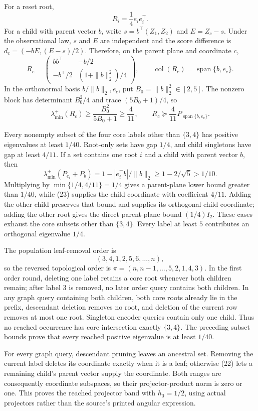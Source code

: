 For a reset root,
\[
 R_i=\frac14e_ie_i^{\top}.
 \tag{21}
\]
For a child with parent vector \(b\), write \(s=b^{\top}(Z_1,Z_2)\) and \(E=Z_c-s\).  Under the observational law, \(s\) and \(E\) are independent and the score difference is \(d_c=(-bE,(E-s)/2)\).  Therefore, on the parent plane and coordinate \(c\),
\[
 R_c=
 \begin{pmatrix}
 bb^{\top}&-b/2\\
 -b^{\top}/2&(1+\|b\|_2^2)/4
 \end{pmatrix},
 \qquad
 \operatorname{col}(R_c)=\operatorname{span}\{b,e_c\}.
 \tag{22}
\]
In the orthonormal basis \(b/\|b\|_2,e_c\), put \(B_0=\|b\|_2^2\in[2,5]\).  The nonzero block has determinant \(B_0^2/4\) and trace \((5B_0+1)/4\), so
\[
 \lambda_{\min}^{+}(R_c)
 \ge\frac{B_0^2}{5B_0+1}\ge\frac4{11},
 \qquad
 R_c\succeq\frac4{11}P_{\operatorname{span}\{b,e_c\}}.
 \tag{23}
\]

Every nonempty subset of the four core labels other than \(\{3,4\}\) has positive eigenvalues at least \(1/40\).  Root-only sets have gap \(1/4\), and child singletons have gap at least \(4/11\).  If a set contains one root \(i\) and a child with parent vector \(b\), then
\[
 \lambda_{\min}^{+}(P_{e_i}+P_b)
 =1-|e_i^{\top}b|/\|b\|_2
 \ge1-2/\sqrt5>1/10.
\]
Multiplying by \(\min\{1/4,4/11\}=1/4\) gives a parent-plane lower bound greater than \(1/40\), while (23) supplies the child coordinate with coefficient \(4/11\).  Adding the other child preserves that bound and supplies its orthogonal child coordinate; adding the other root gives the direct parent-plane bound \((1/4)I_2\).  These cases exhaust the core subsets other than \(\{3,4\}\).  Every label at least \(5\) contributes an orthogonal eigenvalue \(1/4\).

The population leaf-removal order is
\[
 (3,4,1,2,5,6,\ldots,n),
\]
so the reversed topological order is \(\pi=(n,n-1,\ldots,5,2,1,4,3)\).  In the first order round, deleting one label retains a core root whenever both children remain; after label \(3\) is removed, no later order query contains both children.  In any graph query containing both children, both core roots already lie in the prefix, descendant deletion removes no root, and deletion of the current row removes at most one root.  Singleton encoder queries contain only one child.  Thus no reached occurrence has core intersection exactly \(\{3,4\}\).  The preceding subset bounds prove that every reached positive eigenvalue is at least \(1/40\).

For every graph query, descendant pruning leaves an ancestral set.  Removing the current label deletes its coordinate exactly when it is a leaf; otherwise (22) lets a remaining child's parent vector supply the coordinate.  Both ranges are consequently coordinate subspaces, so their projector-product norm is zero or one.  This proves the reached projector band with \(h_0=1/2\), using actual projectors rather than the source's printed angular expression.

